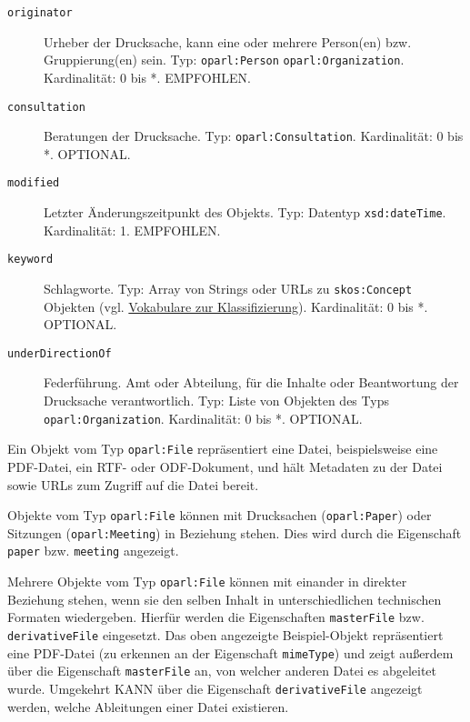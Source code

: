 \documentclass[,a4paper]{article}
\begin{document}
\begin{description}
\item[\texttt{originator}]
Urheber der Drucksache, kann eine oder mehrere Person(en) bzw.
Gruppierung(en) sein. Typ: \texttt{oparl:Person} \textbar{}
\texttt{oparl:Organization}. Kardinalität: 0 bis *. EMPFOHLEN.
\item[\texttt{consultation}]
Beratungen der Drucksache. Typ: \texttt{oparl:Consultation}.
Kardinalität: 0 bis *. OPTIONAL.
\item[\texttt{modified}]
Letzter Änderungszeitpunkt des Objekts. Typ: Datentyp
\texttt{xsd:dateTime}. Kardinalität: 1. EMPFOHLEN.
\item[\texttt{keyword}]
Schlagworte. Typ: Array von Strings oder URLs zu \texttt{skos:Concept}
Objekten (vgl. \hyperref[vokabulareux5fklassifizierung]{Vokabulare zur
Klassifizierung}). Kardinalität: 0 bis *. OPTIONAL.
\item[\texttt{underDirectionOf}]
Federführung. Amt oder Abteilung, für die Inhalte oder Beantwortung der
Drucksache verantwortlich. Typ: Liste von Objekten des Typs
\texttt{oparl:Organization}. Kardinalität: 0 bis *. OPTIONAL.
\end{description}


Ein Objekt vom Typ \texttt{oparl:File} repräsentiert eine Datei,
beispielsweise eine PDF-Datei, ein RTF- oder ODF-Dokument, und hält
Metadaten zu der Datei sowie URLs zum Zugriff auf die Datei bereit.

Objekte vom Typ \texttt{oparl:File} können mit Drucksachen
(\texttt{oparl:Paper}) oder Sitzungen (\texttt{oparl:Meeting}) in
Beziehung stehen. Dies wird durch die Eigenschaft \texttt{paper} bzw.
\texttt{meeting} angezeigt.

Mehrere Objekte vom Typ \texttt{oparl:File} können mit einander in
direkter Beziehung stehen, wenn sie den selben Inhalt in
unterschiedlichen technischen Formaten wiedergeben. Hierfür werden die
Eigenschaften \texttt{masterFile} bzw. \texttt{derivativeFile}
eingesetzt. Das oben angezeigte Beispiel-Objekt repräsentiert eine
PDF-Datei (zu erkennen an der Eigenschaft \texttt{mimeType}) und zeigt
außerdem über die Eigenschaft \texttt{masterFile} an, von welcher
anderen Datei es abgeleitet wurde. Umgekehrt KANN über die Eigenschaft
\texttt{derivativeFile} angezeigt werden, welche Ableitungen einer Datei
existieren.
\end{document}
